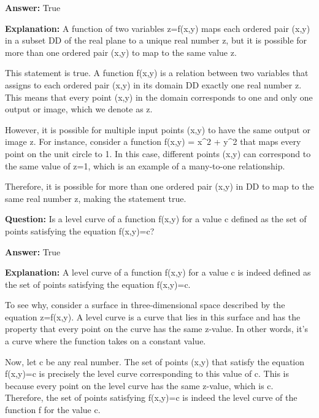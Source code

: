 \documentclass{article}
\begin{document}
                \textbf{Answer:} True

                \textbf{Explanation:} A function of two variables z=f(x,y) maps each ordered pair (x,y) in a subset DD of the real plane to a unique real number z, but it is possible for more than one ordered pair (x,y) to map to the same value z.

This statement is true. A function f(x,y) is a relation between two variables that assigns to each ordered pair (x,y) in its domain DD exactly one real number z. This means that every point (x,y) in the domain corresponds to one and only one output or image, which we denote as z.

However, it is possible for multiple input points (x,y) to have the same output or image z. For instance, consider a function f(x,y) = x{\textasciicircum}2 + y{\textasciicircum}2 that maps every point on the unit circle to 1. In this case, different points (x,y) can correspond to the same value of z=1, which is an example of a many-to-one relationship.

Therefore, it is possible for more than one ordered pair (x,y) in DD to map to the same real number z, making the statement true.
                
                \vspace{0.5cm} 
        
            
                \textbf {Question:} Is a level curve of a function f(x,y) for a value c defined as the set of points satisfying the equation f(x,y)=c?
                
                \textbf{Answer:} True

                \textbf{Explanation:} A level curve of a function f(x,y) for a value c is indeed defined as the set of points satisfying the equation f(x,y)=c.

To see why, consider a surface in three-dimensional space described by the equation z=f(x,y). A level curve is a curve that lies in this surface and has the property that every point on the curve has the same z-value. In other words, it's a curve where the function takes on a constant value.

Now, let c be any real number. The set of points (x,y) that satisfy the equation f(x,y)=c is precisely the level curve corresponding to this value of c. This is because every point on the level curve has the same z-value, which is c. Therefore, the set of points satisfying f(x,y)=c is indeed the level curve of the function f for the value c.
\end{document}
